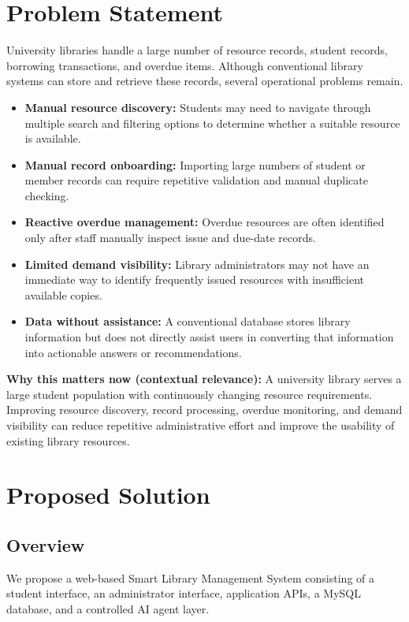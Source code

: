 \documentclass[11pt,a4paper]{article}
\begin{document}
\section{Problem Statement}
University libraries handle a large number of resource records, student records, borrowing transactions, and overdue items. Although conventional library systems can store and retrieve these records, several operational problems remain.
\begin{itemize}
    \item \textbf{Manual resource discovery:} Students may need to navigate through multiple search and filtering options to determine whether a suitable resource is available.
    \item \textbf{Manual record onboarding:} Importing large numbers of student or member records can require repetitive validation and manual duplicate checking.
    \item \textbf{Reactive overdue management:} Overdue resources are often identified only after staff manually inspect issue and due-date records.
    \item \textbf{Limited demand visibility:} Library administrators may not have an immediate way to identify frequently issued resources with insufficient available copies.
    \item \textbf{Data without assistance:} A conventional database stores library information but does not directly assist users in converting that information into actionable answers or recommendations.
\end{itemize}
\textbf{Why this matters now (contextual relevance):} A university library serves a large student population with continuously changing resource requirements. Improving resource discovery, record processing, overdue monitoring, and demand visibility can reduce repetitive administrative effort and improve the usability of existing library resources.

\section{Proposed Solution}
\subsection{Overview}
We propose a web-based Smart Library Management System consisting of a student interface, an administrator interface, application APIs, a MySQL database, and a controlled AI agent layer.
\end{document}
